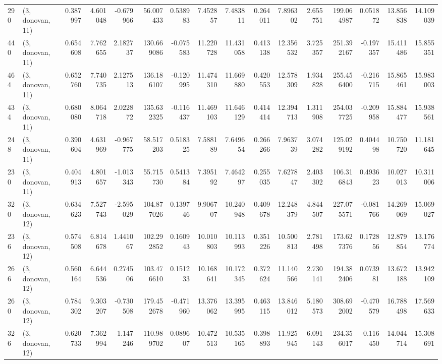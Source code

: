 \begin{tabular}{llrrrrrrrrrrrrrr}
290 &  (3, donovan, 11) &   0.387997 &   4.601048 &  -0.679966 &    56.007433 &   0.538983 &   7.452857 &   7.483811 &  0.264011 &   7.896302 &   2.655751 &   199.064987 &   0.051872 &  13.856838 &  14.109039 \\
440 &  (3, donovan, 11) &   0.654608 &   7.762655 &   2.182737 &   130.669086 &  -0.075583 &  11.220728 &  11.431058 &  0.413138 &  12.356532 &   3.725357 &   251.392167 &  -0.197357 &  15.411486 &  15.855351 \\
464 &  (3, donovan, 11) &   0.652760 &   7.740735 &   2.127513 &   136.186107 &  -0.120995 &  11.474310 &  11.669880 &  0.420553 &  12.578309 &   1.934828 &   255.456400 &  -0.216715 &  15.865461 &  15.983003 \\
434 &  (3, donovan, 11) &   0.680080 &   8.064718 &   2.022872 &   135.632325 &  -0.116437 &  11.469103 &  11.646129 &  0.414414 &  12.394713 &   1.311908 &   254.037725 &  -0.209958 &  15.884477 &  15.938561 \\
248 &  (3, donovan, 11) &   0.390604 &   4.631969 &  -0.967775 &    58.517203 &   0.518325 &   7.588189 &   7.649654 &  0.266266 &   7.963739 &   3.074282 &   125.029192 &   0.404498 &  10.750720 &  11.181645 \\
230 &  (3, donovan, 11) &   0.404913 &   4.801657 &  -1.013343 &    55.715730 &   0.541384 &   7.395192 &   7.464297 &  0.255035 &   7.627847 &   2.403302 &   106.316843 &   0.493623 &  10.027013 &  10.311006 \\
320 &  (3, donovan, 12) &   0.634623 &   7.527743 &  -2.595029 &   104.877026 &   0.139746 &   9.906707 &  10.240948 &  0.409678 &  12.248379 &   4.844507 &   227.075571 &  -0.081766 &  14.269069 &  15.069027 \\
236 &  (3, donovan, 12) &   0.574508 &   6.814678 &   1.441067 &   102.292852 &   0.160943 &  10.010803 &  10.113993 &  0.351226 &  10.500813 &   2.781498 &   173.627376 &   0.172856 &  12.879854 &  13.176774 \\
266 &  (3, donovan, 12) &   0.560164 &   6.644536 &   0.274506 &   103.476610 &   0.151233 &  10.168641 &  10.172345 &  0.372624 &  11.140566 &   2.730141 &   194.382406 &   0.073981 &  13.672188 &  13.942109 \\
260 &  (3, donovan, 12) &   0.784302 &   9.303207 &  -0.730508 &   179.452678 &  -0.471960 &  13.376062 &  13.395995 &  0.463115 &  13.846012 &   5.180573 &   308.692002 &  -0.470579 &  16.788498 &  17.569633 \\
326 &  (3, donovan, 12) &   0.620733 &   7.362994 &  -1.147246 &   110.989702 &   0.089607 &  10.472513 &  10.535165 &  0.398893 &  11.925945 &   6.091143 &   234.356017 &  -0.116450 &  14.044714 &  15.308691 \\

\end{tabular}
